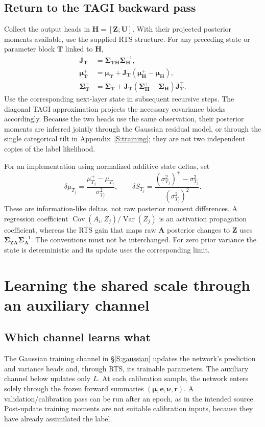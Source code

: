 \documentclass[letterpaper]{article}
\newcommand{\Var}{\operatorname{Var}}
\newcommand{\Cov}{\operatorname{Cov}}
\begin{document}
\subsection{Return to the TAGI backward pass}
Collect the output heads in $\bm H=[\bm Z;\bm U]$. With their projected posterior moments available, use the supplied RTS structure. For any preceding state or parameter block $\bm T$ linked to $\bm H$,
\begin{align}
\mathbf J_{\bm T}&=\bm\Sigma_{\bm T\bm H}\bm\Sigma_{\bm H}^{-1},\\
\bm\mu_{\bm T}^+&=\bm\mu_{\bm T}+\mathbf J_{\bm T}(\bm\mu_{\bm H}^+-\bm\mu_{\bm H}),\\
\bm\Sigma_{\bm T}^+&=\bm\Sigma_{\bm T}+\mathbf J_{\bm T}(\bm\Sigma_{\bm H}^+-\bm\Sigma_{\bm H})\mathbf J_{\bm T}^\intercal.
\label{E:rts}
\end{align}
Use the corresponding next-layer state in subsequent recursive steps. The diagonal TAGI approximation projects the necessary covariance blocks accordingly. Because the two heads use the same observation, their posterior moments are inferred jointly through the Gaussian residual model, or through the single categorical tilt in Appendix~\ref{S:training}; they are not two independent copies of the label likelihood.

For an implementation using normalized additive state deltas, set
\begin{equation}
\delta\mu_{T_j}=\frac{\mu_{T_j}^+-\mu_{T_j}}{\sigma_{T_j}^2},\qquad
\delta S_{T_j}=\frac{(\sigma_{T_j}^2)^+-\sigma_{T_j}^2}{(\sigma_{T_j}^2)^2}.
\label{E:deltas}
\end{equation}
These are information-like deltas, not raw posterior moment differences. A regression coefficient $\Cov(A_i,Z_j)/\Var(Z_j)$ is an activation propagation coefficient, whereas the RTS gain that maps raw $\bm A$ posterior changes to $\bm Z$ uses $\bm\Sigma_{\bm Z\bm A}\bm\Sigma_{\bm A}^{-1}$. The conventions must not be interchanged. For zero prior variance the state is deterministic and its update uses the corresponding limit.

\section{Learning the shared scale through an auxiliary channel}\label{S:calibration}
\subsection{Which channel learns what}
The Gaussian training channel in \S\ref{S:gaussian} updates the network's prediction and variance heads and, through RTS, its trainable parameters. The auxiliary channel below updates only $L$. At each calibration sample, the network enters solely through the frozen forward summaries $(\bm\mu,\bm e,\bm\nu,\bm r)$. A validation/calibration pass can be run after an epoch, as in the intended source. Post-update training moments are not suitable calibration inputs, because they have already assimilated the label.
\end{document}
